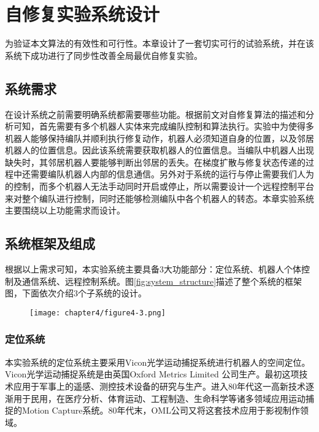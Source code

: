 \chapter{自修复实验系统设计}
为验证本文算法的有效性和可行性。本章设计了一套切实可行的试验系统，并在该系统下成功进行了同步性改善全局最优自修复实验。

\section{系统需求}
在设计系统之前需要明确系统都需要哪些功能。根据前文对自修复算法的描述和分析可知，首先需要有多个机器人实体来完成编队控制和算法执行。实验中为使得多机器人能够保持编队并顺利执行修复动作，机器人必须知道自身的位置，以及邻居机器人的位置信息。因此该系统需要获取机器人的位置信息。当编队中机器人出现缺失时，其邻居机器人要能够判断出邻居的丢失。在梯度扩散与修复状态传递的过程中还需要编队机器人内部的信息通信。另外对于系统的运行与停止需要我们人为的控制，而多个机器人无法手动同时开启或停止，所以需要设计一个远程控制平台来对整个编队进行控制，同时还能够检测编队中各个机器人的转态。本章实验系统主要围绕以上功能需求而设计。

\section{系统框架及组成}
根据以上需求可知，本实验系统主要具备3大功能部分：定位系统、机器人个体控制及通信系统、远程控制系统。图\ref{fig:system_structure}描述了整个系统的框架图，下面依次介绍3个子系统的设计。
\begin{figure}[!htbp]
	\centering
	\texttt{[image: chapter4/figure4-3.png]}
\end{figure}

\subsection{定位系统}
本实验系统的定位系统主要采用Vicon光学运动捕捉系统进行机器人的空间定位。Vicon光学运动捕捉系统是由英国Oxford Metrics Limited 公司生产。最初这项技术应用于军事上的遥感、测控技术设备的研究与生产。进入80年代这一高新技术逐渐用于民用，在医疗分析、体育运动、工程制造、生命科学等诸多领域应用运动捕捉的Motion Capture系统。80年代末，OML公司又将这套技术应用于影视制作领域。
\begin{figure}[!htbp]
	\centering
\end{figure}

